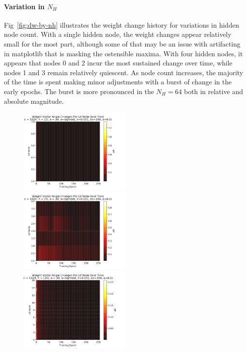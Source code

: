 \documentclass[10pt,epsf]{article}
\begin{document}
{{    \paragraph{Variation in $N_H$}{
      Fig~\ref{fig:dw-by-nh} illustrates the weight change history for variations in hidden node count.
      With a single hidden node, the weight changes appear relatively small for the most part, although
      some of that may be an issue with artifacting in matplotlib that is masking the ostensible maxima.
      With four hidden nodes, it appears that nodes 0 and 2 incur the most sustained change over time,
      while nodes 1 and 3 remain relatively quiescent. As node count increases, the majority of the time
      is spent making minor adjustments with a burst of change in the early epochs. The burst is more
      pronounced in the $N_H = 64$ both in relative and absolute magnitude.
    }
    \begin{figure}[H]
      \includegraphics[width=0.5\textwidth]{./img/1-0.001-160-0-sigmoid-1/weight-angle-changes-L0-255.png}
      \includegraphics[width=0.5\textwidth]{./img/4-0.001-160-0-sigmoid-1/weight-angle-changes-L0-255.png}
      \includegraphics[width=0.5\textwidth]{./img/16-0.001-160-0-sigmoid-1/weight-angle-changes-L0-255.png}

\end{figure}}}
\end{document}
